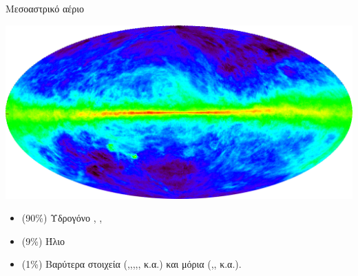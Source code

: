 \documentclass{beamer}
\begin{document}
\begin{frame}{Μεσοαστρικό αέριο}%
\begin{center}
	\includegraphics[width=1\linewidth]{../Document/Images/21}
\end{center}


		\begin{itemize}
			\item{(90\%) Υδρογόνο  , , }	
			\item{(9\%) Ήλιο }	
			\item{(1\%) Βαρύτερα στοιχεία  (,,,,, κ.α.) και μόρια (,, κ.α.).}
		\end{itemize}

\end{frame}
\end{document}
